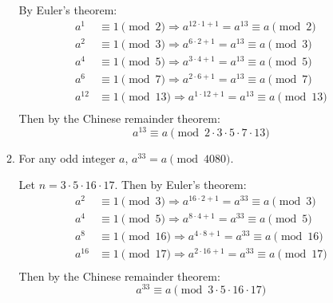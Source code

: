 \documentclass[12pt]{exam}
\theoremstyle{definition}
\begin{document}
\begin{enumerate}
\begin{enumerate}
                        \begin{answer}
                              By Euler's theorem:
                              \[
                                    \begin{aligned}
                                          a^1    & \equiv 1 \pmod{2}  \Rightarrow a^{12\cdot1+1} = a^{13} \equiv a \pmod{2}   \\
                                          a^{2}  & \equiv 1 \pmod{3} \Rightarrow a^{6\cdot2+1} = a^{13}  \equiv a \pmod{3}    \\
                                          a^{4}  & \equiv 1 \pmod{5} \Rightarrow a^{3\cdot4+1} = a^{13}  \equiv a \pmod{5}    \\
                                          a^{6}  & \equiv 1 \pmod{7} \Rightarrow a^{2\cdot6+1} = a^{13}  \equiv a \pmod{7}    \\
                                          a^{12} & \equiv 1 \pmod{13} \Rightarrow a^{1\cdot12+1} = a^{13}  \equiv a \pmod{13} \\
                                    \end{aligned}
                              \]
                              Then by the Chinese remainder theorem:
                              \[
                                    a^{13} \equiv a \pmod{2 \cdot 3 \cdot 5 \cdot 7 \cdot 13}
                              \]
                        \end{answer}

                  \item For any odd integer $a$, $a^{33}  =a \pmod {4080}$.\newline
                        [Hint: $4080 = 15 \cdot 16 \cdot 17$.]
                        \newpage
                        \begin{answer}
                              Let $n = 3 \cdot 5 \cdot 16 \cdot 17$.
                              Then by Euler's theorem:
                              \[
                                    \begin{aligned}
                                          a^2    & \equiv 1 \pmod{3}  \Rightarrow a^{16\cdot2+1} = a^{33}  \equiv a \pmod{3}  \\
                                          a^{4}  & \equiv 1 \pmod{5}  \Rightarrow a^{8\cdot4+1}  = a^{33}  \equiv a \pmod{5}  \\
                                          a^{8}  & \equiv 1 \pmod{16} \Rightarrow a^{4\cdot8+1}  = a^{33}  \equiv a \pmod{16} \\
                                          a^{16} & \equiv 1 \pmod{17} \Rightarrow a^{2\cdot16+1} = a^{33}  \equiv a \pmod{17} \\
                                    \end{aligned}
                              \]
                              Then by the Chinese remainder theorem:
                              \[
                                    a^{33} \equiv a \pmod{3 \cdot 5 \cdot 16 \cdot 17}
                              \]
                        \end{answer}


\end{enumerate}
\end{enumerate}
\end{document}
